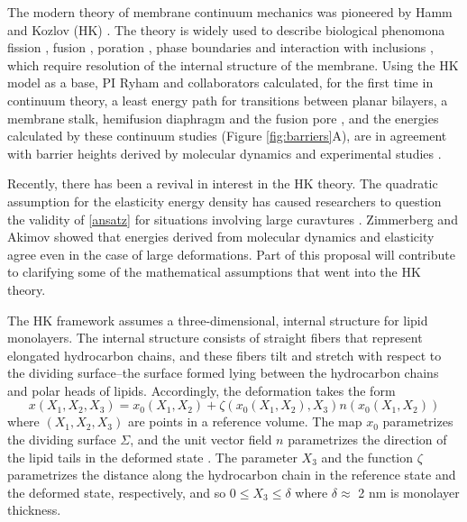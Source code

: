 The modern theory of membrane continuum mechanics
was pioneered by Hamm and Kozlov (HK) \cite{HaKo2000}.
The theory is widely used to describe biological phenomona 
fission \cite{10.1016/j.chemphyslip.2014.07.006, 10.1038/nature14509, 10.1103/PhysRevE.79.031926},
fusion \cite{10.1016/S0006-3495(02)75450-7,10.1073/pnas.121191898,10.1073/pnas.1119442109} ,
poration \cite{10.1016/j.bpj.2019.11.2221}, phase boundaries and interaction with inclusions
\cite{https://doi.org/10.1038/nrm.2017.16,10.1016/j.bpj.2019.11.2209, https://doi.org/10.1038/s41598-020-61110-2}, which require resolution of the internal structure of the membrane.  
Using the HK  model as a base,
PI Ryham and collaborators calculated, for the first time in continuum theory, a least energy path for transitions between planar bilayers, a membrane stalk,
hemifusion diaphragm and the fusion pore \cite{RyWaCo13, RyKlYaCo16},
and the energies calculated by these continuum studies (Figure \ref{fig:barriers}A),
are in agreement with barrier heights derived by molecular dynamics and experimental studies \cite{FrRoPi17}.  

Recently, there has been a revival in interest in the HK theory. The quadratic assumption
for the elasticity energy density has caused researchers to question the validity of \eqref{ansatz}
for situations involving large curavtures \cite{PRL, https://doi.org/10.1016/j.bbamem.2016.02.003}. Zimmerberg and Akimov \cite{https://doi.org/10.1039/C9SM02079A}
showed that energies derived from molecular dynamics and elasticity agree even in the case of large deformations.
Part of this proposal will contribute to clarifying some of the mathematical
assumptions that went into the HK theory. 


The HK framework assumes a three-dimensional, internal structure for lipid monolayers.
The internal structure consists of straight fibers that represent elongated hydrocarbon chains, and these fibers
tilt and stretch with respect to the dividing surface--the surface formed lying between the hydrocarbon chains and polar heads of lipids.
Accordingly, the deformation takes the form 
\begin{equation}
  \label{LMdeformation}
x(X_1, X_2, X_3) = x_0(X_1, X_2) + \zeta(x_0(X_1, X_2), X_3) n(x_0(X_1, X_2))
\end{equation}
where $(X_1,X_2,X_3)$ are points in a reference volume.
The map $x_0$ parametrizes the dividing surface $\Sigma$, and the unit vector field $n$ parametrizes the
direction of the lipid tails in the deformed state \cite{doi:10.1021/jp075641w,KLAUDA20083074}.
The parameter $X_3$ and the function $\zeta$ parametrizes the distance along the hydrocarbon chain in the reference state
and the deformed state, respectively, and so $0 \leq X_3 \leq \delta$ where $\delta \approx $ 2 nm is monolayer thickness. 

